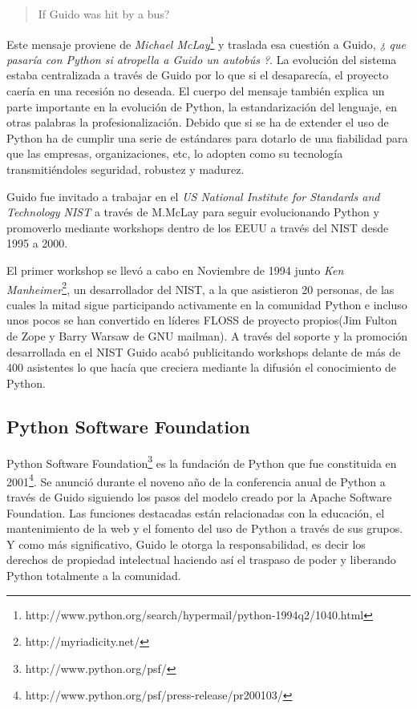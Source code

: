\documentclass[11pt]{scrartcl}
\begin{document}
\begin{quote}
If Guido was hit by a bus?
\end{quote}

Este mensaje proviene de \emph{Michael McLay}\footnote{http://www.python.org/search/hypermail/python-1994q2/1040.html} y traslada esa cuestión a Guido, \emph{¿ que pasaría con Python si atropella a Guido un autobús ?}. La evolución del sistema estaba centralizada a través de Guido por lo que si el desaparecía, el proyecto caería en una recesión no deseada.
El cuerpo del mensaje también explica un parte importante en la evolución de Python, la estandarización del lenguaje, en otras palabras la profesionalización. Debido que si se ha de extender el uso de Python ha de cumplir una serie de estándares para dotarlo de una fiabilidad para que las empresas, organizaciones, etc, lo adopten como su tecnología transmitiéndoles seguridad, robustez y madurez.

Guido fue invitado a trabajar en el \emph{US National Institute for Standards and Technology NIST} a través de M.McLay para seguir evolucionando Python y promoverlo mediante workshops dentro de los EEUU a través del NIST desde 1995 a 2000.

El primer workshop se llevó a cabo en Noviembre de 1994 junto \emph{Ken Manheimer}\footnote{http://myriadicity.net/}, un desarrollador del NIST, a la que asistieron 20 personas, de las cuales la mitad sigue participando activamente en la comunidad Python e incluso unos pocos se han convertido en líderes FLOSS de proyecto propios(Jim Fulton de Zope y Barry Warsaw de GNU mailman). A través del soporte y la promoción desarrollada en el NIST Guido acabó publicitando workshops delante de más de 400 asistentes lo que hacía que creciera mediante la difusión el conocimiento de Python.

\subsection{Python Software Foundation}\label{sec:psf}

Python Software Foundation\footnote{http://www.python.org/psf/} es la fundación de Python que fue constituida en 2001\footnote{http://www.python.org/psf/press-release/pr200103/}. Se anunció durante el noveno año de la conferencia anual de Python a través de Guido siguiendo los pasos del modelo creado por la Apache Software Foundation.
Las funciones destacadas están relacionadas con la educación, el mantenimiento de la web y el fomento del uso de Python a través de sus grupos. Y como más significativo, Guido le otorga la responsabilidad, es decir los derechos de propiedad intelectual haciendo así el traspaso de poder y liberando Python totalmente a la comunidad.
\end{document}
